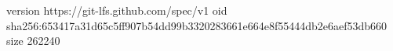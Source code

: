 version https://git-lfs.github.com/spec/v1
oid sha256:653417a31d65c5ff907b54dd99b3320283661e664e8f55444db2e6aef53db660
size 262240
